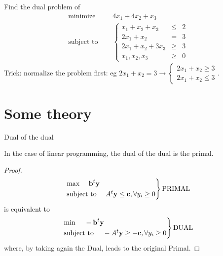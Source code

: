 \documentclass[c]{beamer}
\begin{document}

\begin{frame}{}
\begin{Exercise}
  Find the dual problem of
  \begin{equation*}
  \begin{aligned}
    \text{minimize } \quad & 4x_1 +4x_2+x_3 \\
    \text{subject to }\quad &
    \left\{
    \begin{array}{rcl}
      x_1+x_2+x_3 &\leq &2 \\
      2x_1+x_2 &= &3 \\
      2x_1+x_2+3x_3 &\geq &3 \\
      x_1,x_2,x_3 &\geq& 0
    \end{array}
    \right.
  \end{aligned}
\end{equation*}
Trick: normalize the problem first: eg $2x_1+x_2=3 \rightarrow \begin{cases}2x_1+x_2 \geq 3\\2x_1+x_2\leq 3\end{cases}$.
\end{Exercise}
\end{frame}

\section{Some theory}

\begin{frame}{Dual of the dual}
\begin{theorem}
  In the case of linear programming, the dual of the dual is the primal.
\end{theorem}
\begin{proof}
 \[
\begin{rcases}
\text{max }\quad\textbf{b}^t \textbf{y}\\
\text{subject to }\quad A^t\textbf{y}\leq \textbf{c}, \forall y_i\geq0
\end{rcases} \text{PRIMAL}
\]
is equivalent to
\[
\begin{rcases}
\text{min }\quad-\textbf{b}^t \textbf{y}\\
\text{subject to }\quad -A^t\textbf{y}\geq -\textbf{c}, \forall y_i\geq0
\end{rcases} \text{DUAL}
\]
where, by taking again the Dual, leads to the original Primal.
\end{proof}
\end{frame}
\end{document}
